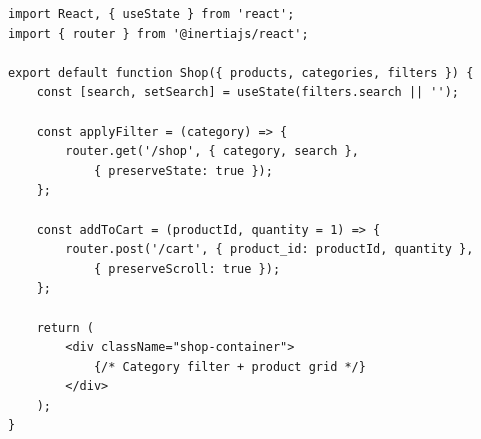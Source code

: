 \begin{lstlisting}[style=jsstyle, caption={React Frontend -- ShopController Page (excerpt)}, label={lst:shop_react}]
import React, { useState } from 'react';
import { router } from '@inertiajs/react';

export default function Shop({ products, categories, filters }) {
    const [search, setSearch] = useState(filters.search || '');

    const applyFilter = (category) => {
        router.get('/shop', { category, search },
            { preserveState: true });
    };

    const addToCart = (productId, quantity = 1) => {
        router.post('/cart', { product_id: productId, quantity },
            { preserveScroll: true });
    };

    return (
        <div className="shop-container">
            {/* Category filter + product grid */}
        </div>
    );
}
\end{lstlisting}
